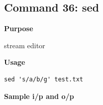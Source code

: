\documentclass{article}
\begin{document}
\subsection{Command 36: sed} 
\textbf{Purpose}
\begin{flushleft}
 stream editor
\end{flushleft}
\textbf{Usage}
\begin{verbatim}
sed 's/a/b/g' test.txt
\end{verbatim}
\textbf{Sample i/p and o/p}
\begin{figure}[H] 
\end{figure}
\end{document}
